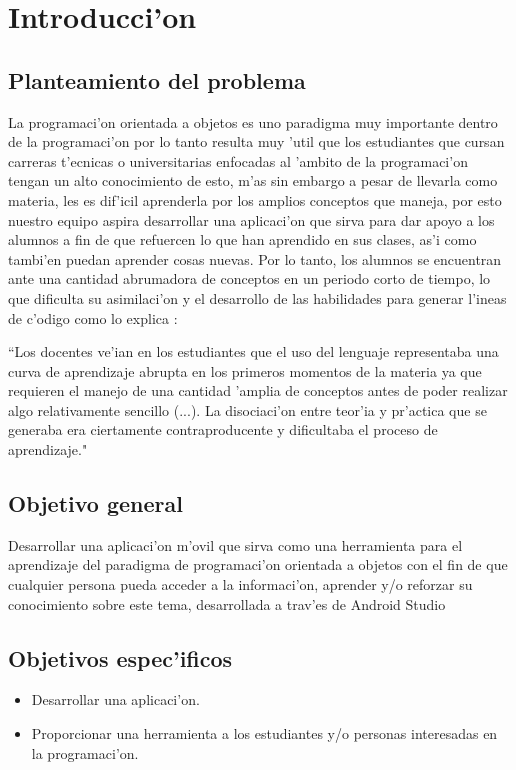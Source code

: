 \chapter{Introducci'on}

\section{Planteamiento del problema}
La programaci'on orientada a objetos es uno paradigma muy importante dentro de la programaci'on por lo tanto resulta muy 'util que los estudiantes que cursan carreras t'ecnicas o universitarias enfocadas al 'ambito de la programaci'on tengan un alto conocimiento de esto, m'as sin embargo a pesar de llevarla como materia, les es dif'icil aprenderla por los amplios conceptos que maneja, por esto nuestro equipo aspira desarrollar una aplicaci'on que sirva para dar apoyo a los alumnos a fin de que refuercen lo que han aprendido en sus clases, as'i como tambi'en puedan aprender cosas nuevas.
Por lo tanto, los alumnos se encuentran ante una cantidad abrumadora de conceptos en un periodo corto de tiempo, lo que dificulta su asimilaci'on y el desarrollo de las habilidades para generar l'ineas de c'odigo como lo explica \cite{spigariol2013ensenando}:

\begin{minipage}{0.9\linewidth}
	 \vspace{5pt}
	 \begin{small}
	 	``Los docentes ve'ian en los estudiantes que el uso del lenguaje representaba una curva de aprendizaje abrupta en los primeros momentos de la materia ya que requieren el manejo de una cantidad 'amplia de conceptos antes de poder realizar algo relativamente sencillo (...). La disociaci'on entre teor'ia y pr'actica que se generaba era ciertamente contraproducente y dificultaba el proceso de aprendizaje."
	 \end{small}
\end{minipage}

\section{Objetivo general}
Desarrollar una aplicaci'on m'ovil que sirva como una herramienta para el aprendizaje del paradigma de programaci'on orientada a objetos con el fin de que cualquier persona pueda acceder a la informaci'on, aprender y/o reforzar su conocimiento sobre este tema, desarrollada a trav'es de Android Studio 

\section{Objetivos espec'ificos} 
\begin{itemize}
\item Desarrollar una aplicaci'on.
\item Proporcionar una herramienta a los estudiantes y/o personas interesadas en la programaci'on.
\end{itemize}
